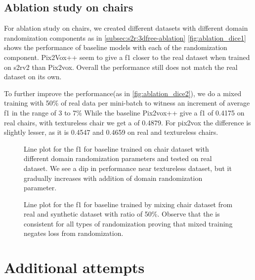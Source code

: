 \subsection{Ablation study on chairs}

For ablation study on chairs, we created different datasets with different domain randomization components as in \autoref{subsec:s2r:3dfree-ablation}
\autoref{fig:ablation_dice1} shows the performance of baseline models with each of the randomization component.
Pix2Vox++ seem to give a \gls{f1} closer to the real dataset when trained on \gls{s2rv2} than Pix2vox.
Overall the performance still does not match the real dataset on its own.

To further improve the performance(as in \autoref{fig:ablation_dice2}), we do a mixed training with 50\% of real data per mini-batch to witness an increment of average \gls{f1} in the range of 3 to 7\%
While the baseline Pix2vox++ give a \gls{f1} of 0.4175 on real chairs, with textureless chair we get a  of 0.4879.
For pix2vox the difference is slightly lesser, as it is 0.4547 and 0.4659 on real and textureless chairs.

\begin{figure}
    \centering
    \resizebox{0.7\textwidth}{!}{}
    \caption{Line plot for the \gls{f1}  for baseline trained on chair dataset with different domain randomization parameters and tested on real dataset.
    We see a dip in performance near textureless dataset, but it gradually increases with addition of domain randomization parameter.}
    \label{fig:ablation_dice1}
\end{figure}

\begin{figure}
    \centering
    \resizebox{0.7\textwidth}{!}{}
    \caption{Line plot for the \gls{f1}  for baseline trained by mixing chair dataset from real and synthetic dataset with ratio of 50\%.
    Observe that the  is consistent for all types of randomization proving that mixed training negates loss from randomization.}
    \label{fig:ablation_dice2}
\end{figure}

\section{Additional attempts}\label{sec:some-failed-attempts}

